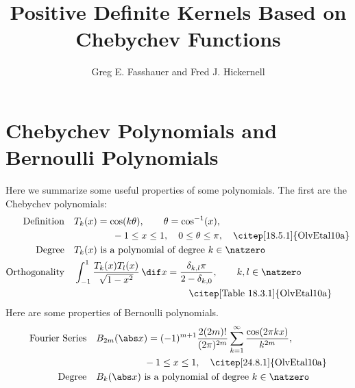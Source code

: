 \documentclass[]{elsarticle}
\theoremstyle{definition}
\begin{document}
\begin{frontmatter}

\title{Positive Definite Kernels Based on Chebychev Functions}
\author{Greg E. Fasshauer and Fred J. Hickernell}
\address{Room E1-208, Department of Applied Mathematics, Illinois Institute of Technology,\\ 10 W.\ 32$^{\text{nd}}$ St., Chicago, IL 60616}
\begin{abstract}
\end{abstract}

\begin{keyword}


\end{keyword}
\end{frontmatter}

\section{Chebychev Polynomials and Bernoulli Polynomials}
Here we summarize some useful properties of some polynomials.  The first are the Chebychev polynomials:
\begin{align}
\text{Definition} \quad & T_k(x) = \cos(k \theta), \qquad \theta=\cos^{-1}(x),\nonumber \\
& \qquad \qquad -1 \le x \le 1, \quad 0 \le \theta \le \pi, \quad \text{\citep[18.5.1]{OlvEtal10a}} \\
\text{Degree} \quad &T_k(x) \text{ is a polynomial of degree } k \in \natzero  \nonumber \\
\text{Orthogonality} \quad & \int_{-1}^{1} \frac{T_k(x)T_{l}(x)}{\sqrt{1-x^2}} \, \dif x = \frac{\delta_{k,l}\pi}{2-\delta_{k,0}} ,  \qquad k,l \in \natzero \nonumber \\
& \qquad \qquad \qquad \qquad \qquad \qquad  \text{\citep[Table 18.3.1]{OlvEtal10a}}
\end{align}
Here are some properties of Bernoulli polynomials.
\begin{align}
\text{Fourier Series} \quad & B_{2m}(\abs x) = (-1)^{m+1} \frac{2 (2m)!} {(2 \pi)^{2m}} \sum_{k=1}^{\infty} \frac{\cos(2 \pi k x)}{k^{2m}}, \nonumber \\
& \qquad \qquad  \quad -1 \le x \le 1, \quad \text{\citep[24.8.1]{OlvEtal10a}} \\
\text{Degree} \quad &B_k(\abs x) \text{ is a polynomial of degree } k \in \natzero  \nonumber \end{align}
\end{document}
